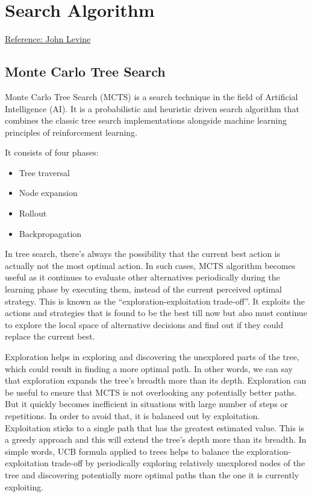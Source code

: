 \chapter{Search Algorithm}

\href{https://www.youtube.com/watch?v=UXW2yZndl7U}{Reference: John Levine}

\section{Monte Carlo Tree Search}
Monte Carlo Tree Search (MCTS) is a search technique in the field of Artificial Intelligence (AI). It is a probabilistic and heuristic driven search algorithm that combines the classic tree search implementations alongside machine learning principles of reinforcement learning.

It consists of four phases:
\begin{itemize}
	\item Tree traversal
	\item Node expansion
	\item Rollout
	\item Backpropagation
\end{itemize}

In tree search, there's always the possibility that the current best action is actually not the most optimal action. In such cases, MCTS algorithm becomes useful as it continues to evaluate other alternatives periodically during the learning phase by executing them, instead of the current perceived optimal strategy. This is known as the ``exploration-exploitation trade-off''. It exploits the actions and strategies that is found to be the best till now but also must continue to explore the local space of alternative decisions and find out if they could replace the current best.

Exploration helps in exploring and discovering the unexplored parts of the tree, which could result in finding a more optimal path. In other words, we can say that exploration expands the tree's breadth more than its depth. Exploration can be useful to ensure that MCTS is not overlooking any potentially better paths. But it quickly becomes inefficient in situations with large number of steps or repetitions. In order to avoid that, it is balanced out by exploitation. Exploitation sticks to a single path that has the greatest estimated value. This is a greedy approach and this will extend the tree's depth more than its breadth. In simple words, UCB formula applied to trees helps to balance the exploration-exploitation trade-off by periodically exploring relatively unexplored nodes of the tree and discovering potentially more optimal paths than the one it is currently exploiting.

